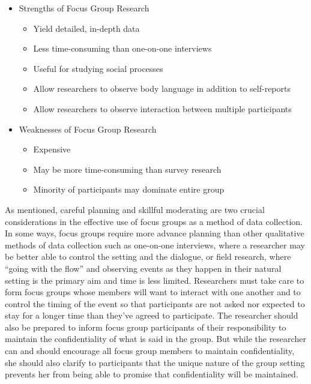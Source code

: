 \begin{itemize}
	\item Strengths of Focus Group Research
	
	\begin{itemize}
		\item Yield detailed, in-depth data
		\item Less time-consuming than one-on-one interviews
		\item Useful for studying social processes
		\item Allow researchers to observe body language in addition to self-reports
		\item Allow researchers to observe interaction between multiple participants
	\end{itemize}
	
	\item Weaknesses of Focus Group Research
	
	\begin{itemize}
		\item Expensive
		\item May be more time-consuming than survey research
		\item Minority of participants may dominate entire group
	\end{itemize}
	
\end{itemize}

As mentioned, careful planning and skillful moderating are two crucial considerations in the effective use of focus groups as a method of data collection. In some ways, focus groups require more advance planning than other qualitative methods of data collection such as one-on-one interviews, where a researcher may be better able to control the setting and the dialogue, or field research, where “going with the flow” and observing events as they happen in their natural setting is the primary aim and time is less limited. Researchers must take care to form focus groups whose members will want to interact with one another and to control the timing of the event so that participants are not asked nor expected to stay for a longer time than they’ve agreed to participate. The researcher should also be prepared to inform focus group participants of their responsibility to maintain the confidentiality of what is said in the group. But while the researcher can and should encourage all focus group members to maintain confidentiality, she should also clarify to participants that the unique nature of the group setting prevents her from being able to promise that confidentiality will be maintained.

